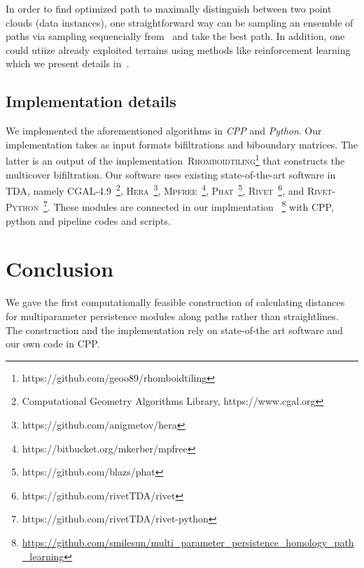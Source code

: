 \documentclass[sigconf, nonacm, natbib=false]{acmart} %
\let\svtodo\todo
\renewcommand\todo[1]{\svtodo[inline]{#1}}
\newcommand{\RC}[1]{\todo{RC:~#1}}
\theoremstyle{plain}
\begin{document}
In order to find optimized path to maximally distinguish between two point clouds (data instances), one straightforward way can be sampling an ensemble of paths via sampling sequencially from~ and take the best path. In addition, one could utiize already exploited terrains using methods like reinforcement learning which we present details in~. 






\subsection{Implementation details}\label{sec:experiments}
We implemented the aforementioned algorithms in \textit{CPP} and \textit{Python}. Our implementation takes as input formats bifiltrations and biboundary matrices. The latter is an output of the implementation~\textsc{Rhomboidtiling}\footnote{https://github.com/geoo89/rhomboidtiling} that constructs the multicover bifiltration. Our software uses existing state-of-the-art software in TDA, namely 
\textsc{CGAL-4.9}~\footnote{Computational Geometry Algorithms Library, https://www.cgal.org},
\textsc{Hera}~\footnote{https://github.com/anigmetov/hera},
\textsc{Mpfree}~\footnote{https://bitbucket.org/mkerber/mpfree},
\textsc{Phat}~\footnote{https://github.com/blazs/phat},
\textsc{Rivet}~\footnote{https://github.com/rivetTDA/rivet}, and
\textsc{Rivet-Python}~\footnote{https://github.com/rivetTDA/rivet-python}. 
These modules are connected in our implmentation ~\footnote{\url{https://github.com/smilesun/multi_parameter_persistence_homology_path_learning}} with CPP, python and pipeline codes and scripts.




\section{Conclusion}\label{sec:conclusion}
We gave the first computationally feasible construction of calculating distances for multiparameter persistence modules along paths rather than straightlines. The construction and the implementation rely on state-of-the art software and our own code in CPP.

\end{document}
